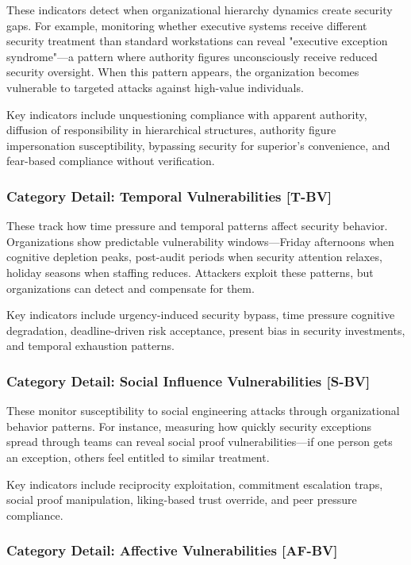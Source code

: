 \documentclass[11pt,a4paper]{article}
\begin{document}
These indicators detect when organizational hierarchy dynamics create security gaps. For example, monitoring whether executive systems receive different security treatment than standard workstations can reveal "executive exception syndrome"—a pattern where authority figures unconsciously receive reduced security oversight. When this pattern appears, the organization becomes vulnerable to targeted attacks against high-value individuals.

Key indicators include unquestioning compliance with apparent authority, diffusion of responsibility in hierarchical structures, authority figure impersonation susceptibility, bypassing security for superior's convenience, and fear-based compliance without verification.

\subsubsection{Category Detail: Temporal Vulnerabilities [T-BV]}

These track how time pressure and temporal patterns affect security behavior. Organizations show predictable vulnerability windows—Friday afternoons when cognitive depletion peaks, post-audit periods when security attention relaxes, holiday seasons when staffing reduces. Attackers exploit these patterns, but organizations can detect and compensate for them.

Key indicators include urgency-induced security bypass, time pressure cognitive degradation, deadline-driven risk acceptance, present bias in security investments, and temporal exhaustion patterns.

\subsubsection{Category Detail: Social Influence Vulnerabilities [S-BV]}

These monitor susceptibility to social engineering attacks through organizational behavior patterns. For instance, measuring how quickly security exceptions spread through teams can reveal social proof vulnerabilities—if one person gets an exception, others feel entitled to similar treatment.

Key indicators include reciprocity exploitation, commitment escalation traps, social proof manipulation, liking-based trust override, and peer pressure compliance.

\subsubsection{Category Detail: Affective Vulnerabilities [AF-BV]}
\end{document}

